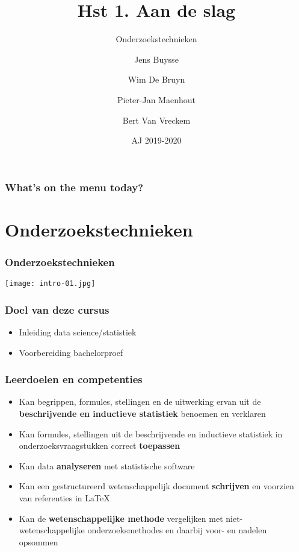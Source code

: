 \documentclass[aspectratio=169]{beamer}
\title{Hst 1. Aan de slag}
\subtitle{Onderzoekstechnieken}
\author{Jens Buysse \and Wim {De Bruyn} \and Pieter-Jan Maenhout \and Bert {Van Vreckem}}
\date{AJ 2019-2020}
\begin{document}
\begin{frame}
  \maketitle
\end{frame}

\begin{frame}
  \frametitle{What's on the menu today?}
  
  \tableofcontents
\end{frame}

\section{Onderzoekstechnieken}

\begin{frame}
  \frametitle{Onderzoekstechnieken}
  
  \centering
  \texttt{[image: intro-01.jpg]}
\end{frame}

\begin{frame}
  \frametitle{Doel van deze cursus}
  
  \begin{itemize}
    \item Inleiding data science/statistiek
    \item Voorbereiding bachelorproef
  \end{itemize}
\end{frame}

\begin{frame}
  \frametitle{Leerdoelen en competenties}
  
  \begin{itemize}
    \item Kan begrippen, formules, stellingen en de uitwerking ervan uit de \textbf{beschrijvende en inductieve statistiek} benoemen en verklaren
    \item Kan formules, stellingen uit de beschrijvende en inductieve statistiek in onderzoeksvraagstukken correct \textbf{toepassen}
    \item Kan data \textbf{analyseren} met statistische software
    \item Kan een gestructureerd wetenschappelijk document \textbf{schrijven} en voorzien van referenties in \LaTeX{}
    \item Kan de \textbf{wetenschappelijke methode} vergelijken met niet-wetenschappelijke onderzoeksmethodes en daarbij voor- en nadelen opsommen 
  \end{itemize}
\end{frame}
\end{document}
